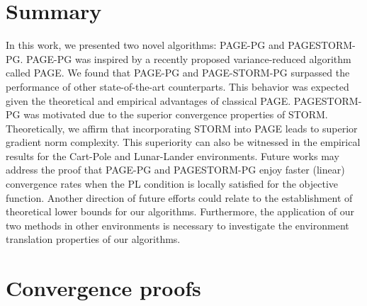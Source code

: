 \documentclass[10pt,twocolumn,letterpaper]{article}
\begin{document}
\section{Summary} \label{summary}

In this work, we presented two novel algorithms: PAGE-PG and PAGESTORM-PG. PAGE-PG was inspired by a recently proposed variance-reduced algorithm called PAGE. We found that PAGE-PG and PAGE-STORM-PG surpassed the performance of other state-of-the-art counterparts. This behavior was expected given the theoretical and empirical advantages of classical PAGE. PAGESTORM-PG was motivated due to the superior convergence properties of STORM. Theoretically, we affirm that incorporating STORM into PAGE leads to superior gradient norm complexity. This superiority can also be witnessed in the empirical results for the Cart-Pole and Lunar-Lander environments. Future works may address the proof that PAGE-PG and PAGESTORM-PG enjoy faster (linear) convergence rates when the PL condition is locally satisfied for the objective function. Another direction of future efforts could relate to the establishment of theoretical lower bounds for our algorithms. Furthermore, the application of our two methods in other environments is necessary to investigate the environment translation properties of our algorithms. 

\printbibliography

\onecolumn
\appendix 
\section{Convergence proofs} \label{appendix}
\end{document}
